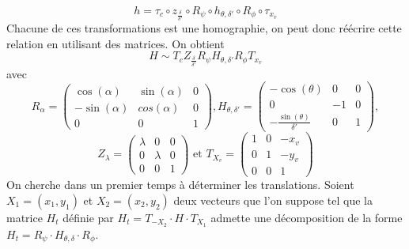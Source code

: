 \begin{equation*}
h= \tau_{c} \circ z_{\frac{\delta}{\delta'}}\circ R_{\psi} \circ h_{\theta,\delta'} \circ R_{\phi} \circ \tau_{x_{v}}
\end{equation*}
Chacune de ces transformations est une homographie, on peut donc réécrire cette relation en utilisant des matrices. On obtient 
 \begin{equation*}
H\sim T_{c} Z_{\frac{\delta}{\delta'}}  R_{\psi}  H_{\theta,\delta'} R_{\phi}  T_{x_{v}}
\end{equation*}
avec
\begin{equation*}
R_{\alpha}=\begin{pmatrix}
\cos(\alpha)&\sin(\alpha)&0\\-\sin(\alpha)&cos(\alpha)&0\\0&0&1
\end{pmatrix}
, H_{\theta,\delta'}=\begin{pmatrix}
-\cos(\theta)&0&0\\0&-1&0\\-\frac{\sin(\theta)}{\delta'}&0&1
\end{pmatrix},
\end{equation*}
\begin{equation*}
Z_{\lambda}=\begin{pmatrix}
\lambda&0&0\\0&\lambda&0\\0&0&1
\end{pmatrix}
\text{ et } T_{X_{v}}=\begin{pmatrix}
1&0&-x_{v}\\0&1&-y_{v}\\0&0&1
\end{pmatrix}
\end{equation*}
 On cherche dans un premier temps à déterminer les translations. Soient $X_1 = (x_1 , y_1 )$ et $X_2 = (x_2 , y_2 )$ deux vecteurs que l'on suppose tel que la matrice $H_t$ définie par $H_t = T_{-X_2}  \cdot H \cdot T_{X_1}$ admette une décomposition de la forme  $H_t=R_{\psi} \cdot H_{\theta,\delta} \cdot R_{\phi}$.
 
